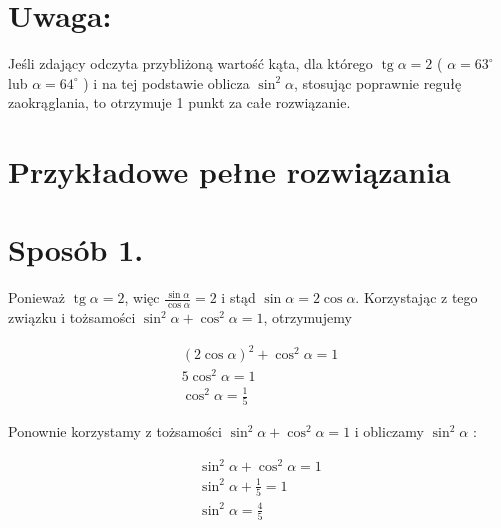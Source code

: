 \documentclass[10pt]{article}
\begin{document}
\section*{Uwaga:}
Jeśli zdający odczyta przybliżoną wartość kąta, dla którego $\operatorname{tg} \alpha=2$ ( $\alpha=63^{\circ}$ lub $\alpha=64^{\circ}$ ) i na tej podstawie oblicza $\sin ^{2} \alpha$, stosując poprawnie regułę zaokrąglania, to otrzymuje 1 punkt za całe rozwiązanie.

\section*{Przykładowe pełne rozwiązania}
\section*{Sposób 1.}
Ponieważ $\operatorname{tg} \alpha=2$, więc $\frac{\sin \alpha}{\cos \alpha}=2$ i stąd $\sin \alpha=2 \cos \alpha$. Korzystając z tego związku i tożsamości $\sin ^{2} \alpha+\cos ^{2} \alpha=1$, otrzymujemy

$$
\begin{gathered}
(2 \cos \alpha)^{2}+\cos ^{2} \alpha=1 \\
5 \cos ^{2} \alpha=1 \\
\cos ^{2} \alpha=\frac{1}{5}
\end{gathered}
$$

Ponownie korzystamy z tożsamości $\sin ^{2} \alpha+\cos ^{2} \alpha=1$ i obliczamy $\sin ^{2} \alpha$ :

$$
\begin{gathered}
\sin ^{2} \alpha+\cos ^{2} \alpha=1 \\
\sin ^{2} \alpha+\frac{1}{5}=1 \\
\sin ^{2} \alpha=\frac{4}{5}
\end{gathered}
$$
\end{document}
